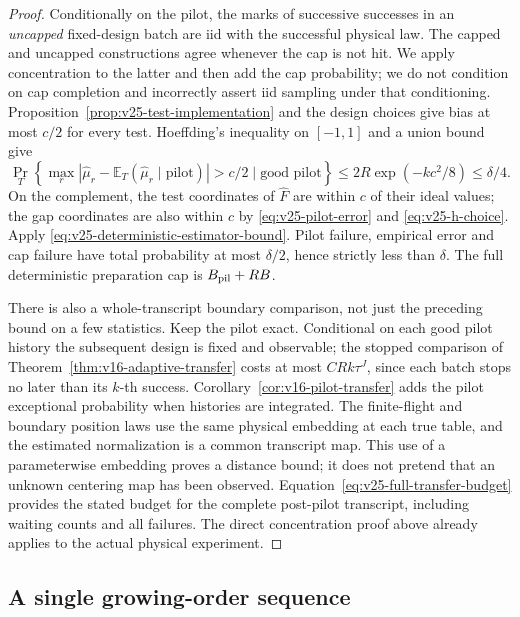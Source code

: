 \begin{proof}
Conditionally on the pilot, the marks of successive successes in an
\emph{uncapped} fixed-design batch are iid with the successful physical law.
The capped and uncapped constructions agree whenever the cap is not hit.
We apply concentration to the latter and then add the cap probability; we
do not condition on cap completion and incorrectly assert iid sampling under
that conditioning.  Proposition~\ref{prop:v25-test-implementation} and the
design choices give bias at most \(c/2\) for every test.  Hoeffding's
inequality on \([-1,1]\) and a union bound give
\[
 \Pr_T\left\{\max_r|\widehat\mu_r-
   \mathbb E_T(\widehat\mu_r\mid\text{pilot})|>c/2
                 \mid\text{good pilot}\right\}
             \le2R\exp(-kc^2/8)\le\delta/4.
\]
On the complement, the test coordinates of \(\widehat F\) are within
\(c\) of their ideal values; the gap coordinates are also within \(c\)
by \eqref{eq:v25-pilot-error} and \eqref{eq:v25-h-choice}.  Apply
\eqref{eq:v25-deterministic-estimator-bound}.  Pilot failure, empirical
error and cap failure have total probability at most \(\delta/2\), hence
strictly less than \(\delta\).  The full deterministic preparation cap is
\(B_{\rm pil}+RB\).

There is also a whole-transcript boundary comparison, not just the preceding
bound on a few statistics.  Keep the pilot exact.  Conditional on each good
pilot history the subsequent design is fixed and observable; the stopped
comparison of Theorem~\ref{thm:v16-adaptive-transfer} costs at most
\(CRk\tau^J\), since each batch stops no later than its \(k\)-th success.
Corollary~\ref{cor:v16-pilot-transfer} adds the pilot exceptional probability
when histories are integrated.  The finite-flight and boundary position
laws use the same physical embedding at each true table, and the estimated
normalization is a common transcript map.  This use of a parameterwise
embedding proves a distance bound; it does not pretend that an unknown
centering map has been observed.  Equation~\eqref{eq:v25-full-transfer-budget}
provides the stated budget for the complete post-pilot transcript, including
waiting counts and all failures.  The direct concentration proof above
already applies to the actual physical experiment.
\end{proof}

\subsection{A single growing-order sequence}

